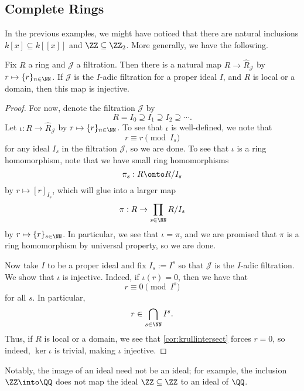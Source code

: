 \subsection{Complete Rings}
In the previous examples, we might have noticed that there are natural inclusions $k[x]\subseteq k[[x]]$ and $\ZZ\subseteq\ZZ_2$. More generally, we have the following.
\begin{lemma} \label{lem:naturalcompletionmap}
	Fix $R$ a ring and $\mathcal J$ a filtration. Then there is a natural map $R\to\widehat R_\mathcal J$ by $r\mapsto\{r\}_{n\in\NN}$. If $\mathcal J$ is the $I$-adic filtration for a proper ideal $I$, and $R$ is local or a domain, then this map is injective.
\end{lemma}
\begin{proof}
	For now, denote the filtration $\mathcal J$ by
	\[R=I_0\supseteq I_1\supseteq I_2\supseteq\cdots.\]
	Let $\iota:R\to\widehat R_\mathcal J$ by $r\mapsto\{r\}_{n\in\NN}$. To see that $\iota$ is well-defined, we note that
	\[r\equiv r\pmod {I_s}\]
	for any ideal $I_s$ in the filtration $\mathcal J$, so we are done. To see that $\iota$ is a ring homomorphism, note that we have small ring homomorphisms
	\[\pi_s:R\onto R/I_s\]
	by $r\mapsto[r]_{I_s}$, which will glue into a larger map
	\[\pi:R\to\prod_{s\in\NN}R/I_s\]
	by $r\mapsto\{r\}_{s\in\NN}$. In particular, we see that $\iota=\pi$, and we are promised that $\pi$ is a ring homomorphism by universal property, so we are done.

	Now take $I$ to be a proper ideal and fix $I_s:=I^s$ so that $\mathcal J$ is the $I$-adic filtration. We show that $\iota$ is injective. Indeed, if $\iota(r)=0$, then we have that
	\[r\equiv0\pmod{I^s}\]
	for all $s$. In particular,
	\[r\in\bigcap_{s\in\NN}I^s.\]
	Thus, if $R$ is local or a domain, we see that \autoref{cor:krullintersect} forces $r=0$, so indeed, $\ker\iota$ is trivial, making $\iota$ injective.
\end{proof}
Notably, the image of an ideal need not be an ideal; for example, the inclusion $\ZZ\into\QQ$ does not map the ideal $\ZZ\subseteq\ZZ$ to an ideal of $\QQ$.

